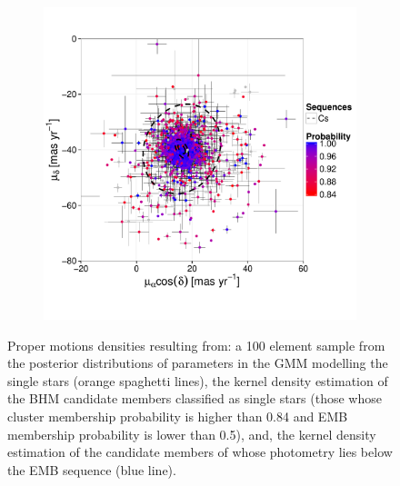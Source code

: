 \begin{figure}[ht!]
\begin{subfigure}[t]{0.45\textwidth}
     \includegraphics[page=3,width=\textwidth]{background/Figures/BHM/Cs_members.pdf}
        \caption{}
    \end{subfigure}
\caption{Proper motions densities resulting from: a 100 element sample from the posterior distributions of parameters in the GMM modelling the single stars (orange spaghetti lines), the kernel density estimation of the BHM candidate members classified as single stars (those whose cluster membership probability is higher than 0.84 and EMB membership probability is lower than 0.5), and, the kernel density estimation of the candidate members of \citet{Bouy2015} whose photometry lies below the EMB sequence (blue line).}
\label{fig:PMCs}
\end{figure}

